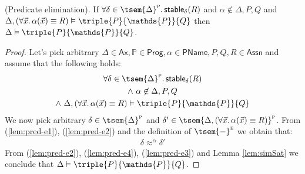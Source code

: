 \begin{lem}
	\label{lem:pred-e}
	(Predicate elimination).
	If $\forall \delta \in \tsem{\Delta}^\textsc{p} \ldotp \mathsf{stable}_\delta(R)$ and $\alpha \not\in \Delta, P, Q$ and $\Delta, (\forall \vec{x} \ldotp \alpha(\vec{x}) \equiv R) \vDash \triple{P}{\mathds{P}}{Q}$ then $\Delta \vDash \triple{P}{\mathds{P}}{Q}$.
	\begin{proof}
		Let's pick arbitrary $\Delta \in \mathsf{Ax}, \mathds{P} \in \mathsf{Prog}, \alpha \in \mathsf{PName}, P, Q, R \in \mathsf{Assn}$ and assume that the following holds:
		\begin{gather}
			\label{lem:pred-e1} \forall \delta \in \tsem{\Delta}^\textsc{p} \ldotp \mathsf{stable}_\delta(R) \\
			\label{lem:pred-e2} \land\ \alpha \not\in \Delta, P, Q \\
			\label{lem:pred-e4} \land\ \Delta, (\forall \vec{x} \ldotp \alpha(\vec{x}) \equiv R) \vDash \triple{P}{\mathds{P}}{Q}
		\end{gather}
		We now pick arbitrary $\delta \in \tsem{\Delta}^\textsc{p}$ and $\delta' \in \tsem{\Delta, (\forall \vec{x} \ldotp \alpha(\vec{x}) \equiv R)}^\textsc{p}$. From (\ref{lem:pred-e1}), (\ref{lem:pred-e2}) and the definition of $\tsem{-}^\textsc{e}$ we obtain that:
		\begin{gather}
			\label{lem:pred-e3} \delta \approx^\alpha \delta'
		\end{gather}
		From (\ref{lem:pred-e2}), (\ref{lem:pred-e4}), (\ref{lem:pred-e3}) and Lemma \ref{lem:simSat} we conclude that $\Delta \vDash \triple{P}{\mathds{P}}{Q}$.
	\end{proof}
\end{lem}